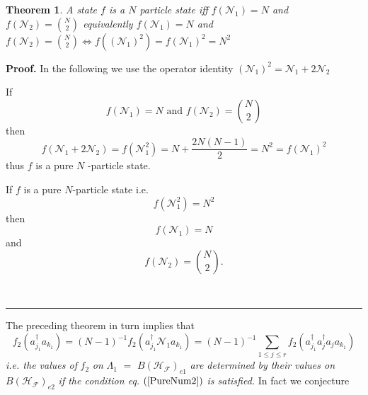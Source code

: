 \documentclass[aps,preprint]{revtex4}%
\newtheorem{theorem}{Theorem}
\newenvironment{proof}[1][Proof]{\noindent\textbf{#1.} }{\ \rule{0.5em}{0.5em}}
\begin{document}
\begin{theorem}
A state $f$ is a $N$ particle state iff $f\left(  \mathcal{N}_{1}\right)  =N$
and $f\left(  \mathcal{N}_{2}\right)  =\binom{N}{2}$ equivalently $f\left(
\mathcal{N}_{1}\right)  =N$ and $f\left(  \mathcal{N}_{2}\right)  =\binom
{N}{2}\Leftrightarrow f\left(  \left(  \mathcal{N}_{1}\right)  ^{2}\right)
=f\left(  \mathcal{N}_{1}\right)  ^{2}=N^{2}$
\end{theorem}

\begin{proof}
In the following we use the operator identity $\left(  \mathcal{N}_{1}\right)
^{2}=\mathcal{N}_{1}+2\mathcal{N}_{2}$

If
\begin{equation}
f\left(  \mathcal{N}_{1}\right)  =N\text{ and }f\left(  \mathcal{N}%
_{2}\right)  =\binom{N}{2}%
\end{equation}
then%
\begin{equation}
f\left(  \mathcal{N}_{1}+2\mathcal{N}_{2}\right)  =f\left(  \mathcal{N}%
_{1}^{2}\right)  =N+\frac{2N\left(  N-1\right)  }{2}=N^{2}=f\left(
\mathcal{N}_{1}\right)  ^{2}%
\end{equation}
thus $f$ is a pure $N$ -particle state.

If $f$ is a pure $N$-particle state i.e.
\begin{equation}
f\left(  \mathcal{N}_{1}^{2}\right)  =N^{2}%
\end{equation}
then
\begin{equation}
f\left(  \mathcal{N}_{1}\right)  =N
\end{equation}
and
\begin{equation}
f\left(  \mathcal{N}_{2}\right)  =\binom{N}{2}.
\end{equation}

\end{proof}

The preceding theorem in turn implies that
\begin{equation}
f_{2}\left(  a_{j_{1}}^{\dagger}a_{k_{1}}\right)  =\left(  N-1\right)
^{-1}f_{2}\left(  a_{j_{1}}^{\dagger}\mathcal{N}_{1}a_{k_{1}}\right)  =\left(
N-1\right)  ^{-1}\sum_{1\leq j\leq r}f_{2}\left(  a_{j_{1}}^{\dagger}%
a_{j}^{\dagger}a_{j}a_{k_{1}}\right)
\end{equation}
\emph{i.e. the values of }$f_{2}$\emph{ on }$\Lambda_{1}$\emph{ }$=$\emph{
}$B\left(  \mathcal{H}_{\mathcal{F}}\right)  _{e1}$\emph{ are determined by
their values on }$B\left(  \mathcal{H}_{\mathcal{F}}\right)  _{e2}$\emph{ if
the condition eq. }$\left(  \ref{PureNum2}\right)  $\emph{ is satisfied. }In
fact we conjecture
\end{document}
